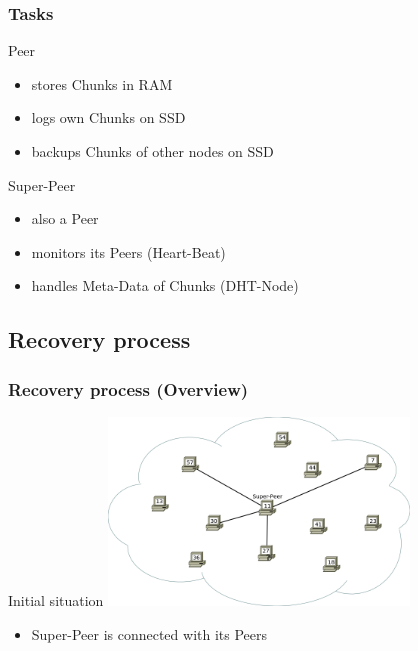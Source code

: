 \documentclass{beamer}
\begin{document}
	\begin{frame}
		\frametitle{Tasks}

		\begin{block}{Peer}
			\begin{itemize}
				\item stores Chunks in RAM
				\item logs own Chunks on SSD
				\item backups Chunks of other nodes on SSD
			\end{itemize}
		\end{block}

		\begin{block}{Super-Peer}
			\begin{itemize}
				\item also a Peer
				\item monitors its Peers (Heart-Beat)
				\item handles Meta-Data of Chunks (DHT-Node)
			\end{itemize}
		\end{block}
	\end{frame}

\subsection{Recovery process}

	\begin{frame}
		\frametitle{Recovery process (Overview)}

		\begin{block}{Initial situation}
			\center\includegraphics[width=8cm]{./img/Recovery_Overview_00}

			\begin{itemize}
				\item Super-Peer is connected with its Peers
			\end{itemize}
		\end{block}
	\end{frame}
\end{document}
